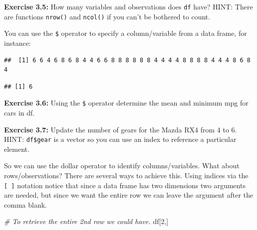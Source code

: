 \documentclass[
]{article}
\newenvironment{Shaded}{\begin{snugshade}}{\end{snugshade}}
\newcommand{\CommentTok}[1]{\textcolor[rgb]{0.56,0.35,0.01}{\textit{#1}}}
\newcommand{\DecValTok}[1]{\textcolor[rgb]{0.00,0.00,0.81}{#1}}
\newcommand{\FunctionTok}[1]{\textcolor[rgb]{0.13,0.29,0.53}{\textbf{#1}}}
\newcommand{\NormalTok}[1]{#1}
\newcommand{\SpecialCharTok}[1]{\textcolor[rgb]{0.81,0.36,0.00}{\textbf{#1}}}
\begin{document}
\textbf{Exercise 3.5:} How many variables and observations does
\texttt{df} have? HINT: There are functions \texttt{nrow()} and
\texttt{ncol()} if you can't be bothered to count.

You can use the \texttt{\$} operator to specify a column/variable from a
data frame, for instance:

\begin{Shaded}
\end{Shaded}

\begin{verbatim}
##  [1] 6 6 4 6 8 6 8 4 4 6 6 8 8 8 8 8 8 4 4 4 4 8 8 8 8 4 4 4 8 6 8 4
\end{verbatim}

\begin{Shaded}
\end{Shaded}

\begin{verbatim}
## [1] 6
\end{verbatim}

\textbf{Exercise 3.6:} Using the \texttt{\$} operator determine the mean
and minimum mpg for cars in df.

\textbf{Exercise 3.7:} Update the number of gears for the Mazda RX4 from
4 to 6. HINT: \texttt{df\$gear} is a vector so you can use an index to
reference a particular element.

So we can use the dollar operator to identify columns/variables. What
about rows/observations? There are several ways to achieve this. Using
indices via the \texttt{{[}\ {]}} notation notice that since a data
frame has two dimensions two arguments are needed, but since we want the
entire row we can leave the argument after the comma blank.

\begin{Shaded}
\begin{Highlighting}[]
\CommentTok{\# To retrieve the entire 2nd row we could have.}
\NormalTok{df[}\DecValTok{2}\NormalTok{,]}
\end{Highlighting}
\end{Shaded}
\end{document}
